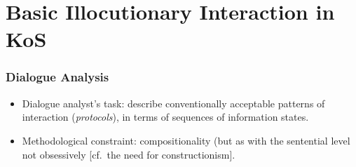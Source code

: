 \documentclass{beamer}
\newcommand{\bit}{\begin{itemize}}
\newcommand{\eit}{\end{itemize}}
\begin{document}
\section{Basic Illocutionary Interaction in KoS}


\begin{frame}\frametitle{Dialogue Analysis}

\bit

\item Dialogue analyst's task: describe conventionally acceptable patterns of interaction
(\emph{protocols}), in terms of sequences of information states.

\item Methodological constraint: compositionality (but as with the
sentential level not obsessively [cf.\ the need for
constructionism].

\eit \end{frame}
\end{document}
